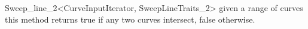 \begin{ccRefClass}{Sweep_line_2<CurveInputIterator, SweepLineTraits_2>}
{given a range of curves this method returns true if any two curves intersect,
false otherwise.}

\end{ccRefClass}

\ccRefPageEnd
